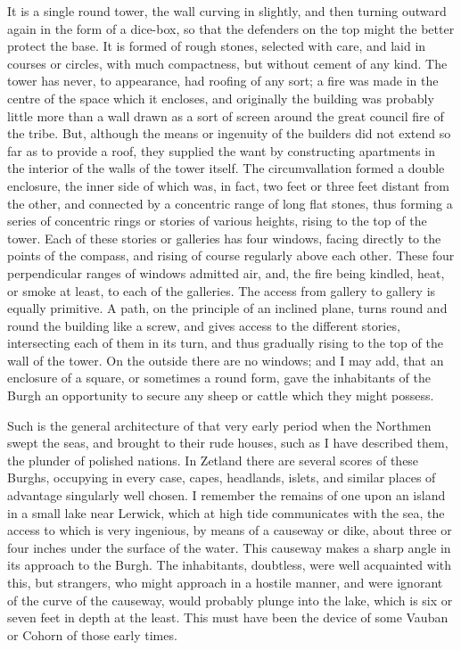 It is a single round tower, the wall curving in slightly, and then
turning outward again in the form of a dice-box, so that the defenders
on the top might the better protect the base. It is formed of rough
stones, selected with care, and laid in courses or circles, with much
compactness, but without cement of any kind. The tower has never, to
appearance, had roofing of any sort; a fire was made in the centre of
the space which it encloses, and originally the building was probably
little more than a wall drawn as a sort of screen around the great
council fire of the tribe. But, although the means or ingenuity of the
builders did not extend so far as to provide a roof, they supplied the
want by constructing apartments in the interior of the walls of the
tower itself. The circumvallation formed a double enclosure, the inner
side of which was, in fact, two feet or three feet distant from the
other, and connected by a concentric range of long flat stones, thus
forming a series of concentric rings or stories of various heights,
rising to the top of the tower. Each of these stories or galleries has
four windows, facing directly to the points of the compass, and rising
of course regularly above each other. These four perpendicular ranges of
windows admitted air, and, the fire being kindled, heat, or smoke at
least, to each of the galleries. The access from gallery to gallery is
equally primitive. A path, on the principle of an inclined plane, turns
round and round the building like a screw, and gives access to the
different stories, intersecting each of them in its turn, and thus
gradually rising to the top of the wall of the tower. On the outside
there are no windows; and I may add, that an enclosure of a square, or
sometimes a round form, gave the inhabitants of the Burgh an opportunity
to secure any sheep or cattle which they might possess.

Such is the general architecture of that very early period when the
Northmen swept the seas, and brought to their rude houses, such as I
have described them, the plunder of polished nations. In Zetland there
are several scores of these Burghs, occupying in every case, capes,
headlands, islets, and similar places of advantage singularly well
chosen. I remember the remains of one upon an island in a small lake
near Lerwick, which at high tide communicates with the sea, the access
to which is very ingenious, by means of a causeway or dike, about three
or four inches under the surface of the water. This causeway makes a
sharp angle in its approach to the Burgh. The inhabitants, doubtless,
were well acquainted with this, but strangers, who might approach in a
hostile manner, and were ignorant of the curve of the causeway, would
probably plunge into the lake, which is six or seven feet in depth at
the least. This must have been the device of some Vauban or Cohorn of
those early times.


